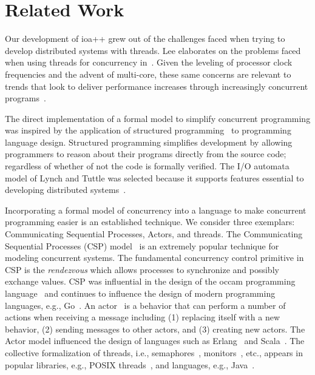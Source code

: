 \section{Related Work\label{related_work}}

Our development of ioa++ grew out of the challenges faced when trying to develop distributed systems with threads.
Lee elaborates on the problems faced when using threads for concurrency in~\cite{lee2006problem}.
Given the leveling of processor clock frequencies and the advent of multi-core, these same concerns are relevant to trends that look to deliver performance increases through increasingly concurrent programs~\cite{sutter2005software}.

The direct implementation of a formal model to simplify concurrent programming was inspired by the application of structured programming~\cite{dijkstra1968letters} to programming language design.
Structured programming simplifies development by allowing programmers to reason about their programs directly from the source code; regardless of whether of not the code is formally verified.
The I/O automata model of Lynch and Tuttle\cite{lynch1987hierarchical} was selected because it supports features essential to developing distributed systems~\cite{lynch1996distributed}.

Incorporating a formal model of concurrency into a language to make concurrent programming easier is an established technique.
We consider three exemplars:  Communicating Sequential Processes, Actors, and threads.
The Communicating Sequential Processes (CSP) model~\cite{hoare1978communicating} is an extremely popular technique for modeling concurrent systems.
The fundamental concurrency control primitive in CSP is the \emph{rendezvous} which allows processes to synchronize and possibly exchange values.
CSP was influential in the design of the occam programming language~\cite{jones1987programming} and continues to influence the design of modern programming languages, e.g., Go~\cite{go}.
An actor~\cite{agha1986actors} is a behavior that can perform a number of actions when receiving a message including (1) replacing itself with a new behavior, (2) sending messages to other actors, and (3) creating new actors.
The Actor model influenced the design of languages such as Erlang~\cite{armstrong1996concurrent} and Scala~\cite{odersky2004overview}.
The collective formalization of threads, i.e., semaphores~\cite{dijkstra1968cooperating}, monitors~\cite{hoare1974monitors}, etc., appears in popular libraries, e.g., POSIX threads~\cite{butenhof1997programming}, and languages, e.g., Java~\cite{christopher2000high}.

